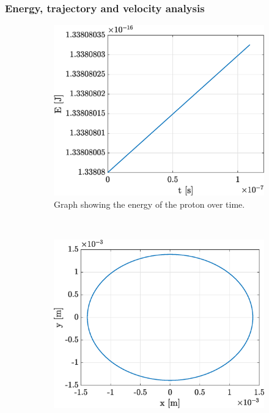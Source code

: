 \documentclass[a4paper,12pt,twoside]{article}
\begin{document}
\subsubsection{Energy, trajectory and velocity analysis}
\begin{figure}[h]
\begin{subfigure}[t]{0.32\textwidth}
	\includegraphics[width=\textwidth]{graphs/app1_ii_ene.eps}
	\caption{Graph showing the energy of the proton over time.}
	\label{fig:app1-ii-ene}
\end{subfigure}
~
\begin{subfigure}[t]{0.32\textwidth}
	\includegraphics[width=\textwidth]{graphs/app1_ii_traj.eps}

\end{subfigure}
\end{figure}
\end{document}
